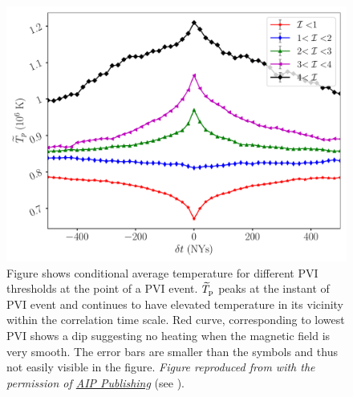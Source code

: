        \begin{figure}
            \begin{center}
                \includegraphics[width=1.\textwidth]{figures/chap6/tem_pvi_lag_psp.pdf}
                \caption[Conditionally averaged $T_{\rm \parallel p}$ from a $\mathcal{I}$
                event]{Figure shows conditional average temperature for different PVI thresholds at
                the point of a PVI event. $\widetilde{T}_{\rm p}$ peaks at the instant of PVI event
                and continues to have elevated temperature in its vicinity within the correlation
                time scale. Red curve, corresponding to lowest PVI shows a dip suggesting no heating
                when the magnetic field is very smooth. The error bars are smaller than the symbols
                and thus not easily visible in the figure. \textit{Figure reproduced from
                \citet{Qudsi2020} with the permission of \href{https://publishing.aip.org/}{AIP
                Publishing}} (see ).}
                \label{fig:tem_pvi_lag}
            \end{center}
        \end{figure}

